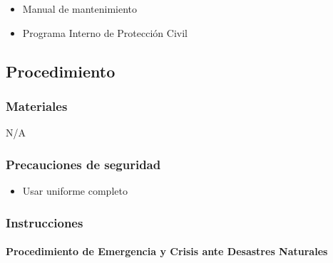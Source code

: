 \begin{itemize}
	\item Manual de mantenimiento
	\item Programa Interno de Protección Civil
\end{itemize}

\subsection{Procedimiento}

\subsubsection{Materiales}

N/A

\subsubsection{Precauciones de seguridad}

\begin{itemize}
	\item Usar uniforme completo
\end{itemize}

\subsubsection{Instrucciones}

\paragraph{Procedimiento de Emergencia y Crisis ante Desastres Naturales}

